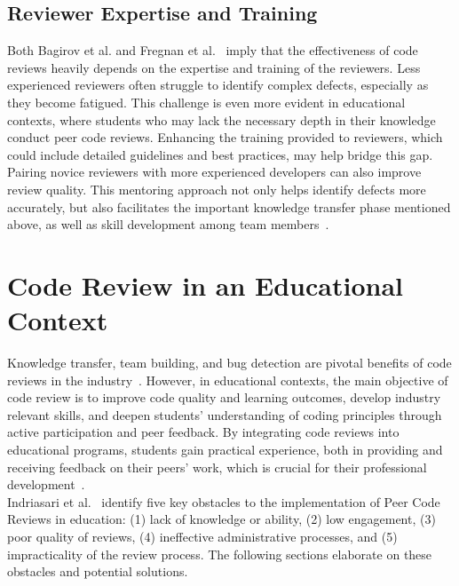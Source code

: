 \subsection{Reviewer Expertise and Training}
Both Bagirov et al. and Fregnan et al.~\cite{Bagirov_2023, Fregnan_2022} imply that the effectiveness of code reviews heavily depends on the expertise and training of the reviewers. Less experienced reviewers often struggle to identify complex defects, especially as they become fatigued. This challenge is even more evident in educational contexts, where students who may lack the necessary depth in their knowledge conduct peer code reviews. Enhancing the training provided to reviewers, which could include detailed guidelines and best practices, may help bridge this gap. Pairing novice reviewers with more experienced developers can also improve review quality. This mentoring approach not only helps identify defects more accurately, but also facilitates the important knowledge transfer phase mentioned above, as well as skill development among team members~\cite{Bagirov_2023, Fregnan_2022}. \\


\section{Code Review in an Educational Context}

Knowledge transfer, team building, and bug detection are pivotal benefits of code reviews in the industry~\cite{Wang_evolution}. However, in educational contexts, the main objective of code review is to improve code quality and learning outcomes, develop industry relevant skills, and deepen students' understanding of coding principles through active participation and peer feedback. By integrating code reviews into educational programs, students gain practical experience, both in providing and receiving feedback on their peers' work, which is crucial for their professional development~\cite{Indriasari_Luxton_2020}. \\

Indriasari et al.~\cite{Indriasari_Luxton_2020} identify five key obstacles to the implementation of Peer Code Reviews in education: (1) lack of knowledge or ability, (2) low engagement, (3) poor quality of reviews, (4) ineffective administrative processes, and (5) impracticality of the review process. The following sections elaborate on these obstacles and potential solutions. \\


